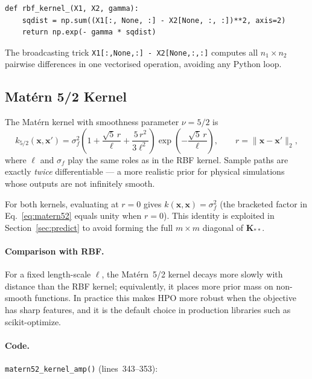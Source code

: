 \documentclass[11pt,a4paper]{article}
\newcommand{\bx}{\bm{x}}
\theoremstyle{remark}
\newcommand{\codefile}[1]{\texttt{#1}}
\newcommand{\coderange}[2]{lines~#1--#2}
\newcommand{\codefn}[1]{\texttt{#1()}}
\begin{document}
\begin{lstlisting}[firstnumber=24, caption=\codefn{rbf\_kernel\_} in \codefile{BO\_func\_YL.py}]
def rbf_kernel_(X1, X2, gamma):
    sqdist = np.sum((X1[:, None, :] - X2[None, :, :])**2, axis=2)
    return np.exp(- gamma * sqdist)
\end{lstlisting}

The broadcasting trick \texttt{X1[:,None,:] - X2[None,:,:]} computes all
$n_1 \times n_2$ pairwise differences in one vectorised operation, avoiding
any Python loop.

\subsection{Mat\'{e}rn 5/2 Kernel}
\label{sec:matern}

The Mat\'{e}rn kernel with smoothness parameter $\nu = 5/2$ is
\begin{equation}
  \label{eq:matern52}
  k_{5/2}(\bx,\bx') = \sigma_f^2
  \left(1 + \frac{\sqrt{5}\,r}{\ell} + \frac{5\,r^2}{3\ell^2}\right)
  \exp\!\left(-\frac{\sqrt{5}\,r}{\ell}\right),
  \qquad r = \|\bx - \bx'\|_2,
\end{equation}
where $\ell$ and $\sigma_f$ play the same roles as in the RBF kernel.
Sample paths are exactly \emph{twice} differentiable --- a more realistic
prior for physical simulations whose outputs are not infinitely smooth.

For both kernels, evaluating at $r = 0$ gives $k(\bx,\bx) = \sigma_f^2$
(the bracketed factor in Eq.~\eqref{eq:matern52} equals unity when $r=0$).
This identity is exploited in Section~\ref{sec:predict} to avoid forming the
full $m \times m$ diagonal of $\bm{K}_{**}$.

\paragraph{Comparison with RBF.}
For a fixed length-scale $\ell$, the Mat\'{e}rn~5/2 kernel decays more
slowly with distance than the RBF kernel; equivalently, it places more prior
mass on non-smooth functions.  In practice this makes HPO more robust when
the objective has sharp features, and it is the default choice in production
libraries such as scikit-optimize.

\paragraph{Code.}
\codefn{matern52\_kernel\_amp} (\coderange{343}{353}):
\end{document}
